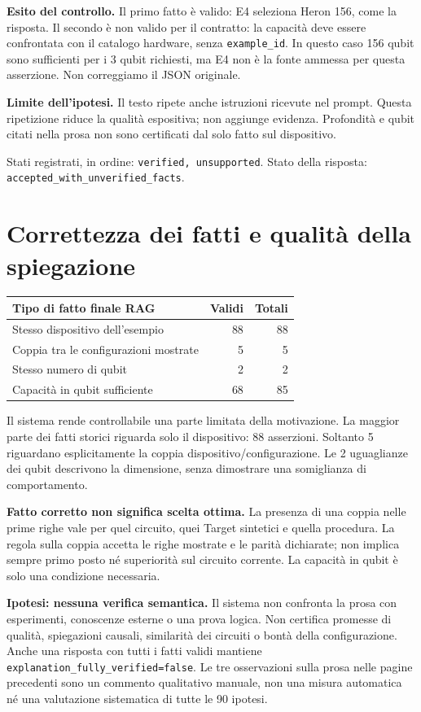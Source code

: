 \documentclass[a4paper,10pt]{article}
\newcommand{\tagline}[1]{{\small\color{ink}\textbf{#1}}\par}
\begin{document}
\textbf{Esito del controllo.} Il primo fatto è valido: E4 seleziona Heron 156, come la risposta. Il secondo è non valido per il contratto: la capacità deve essere confrontata con il catalogo hardware, senza \texttt{example\_id}. In questo caso 156 qubit sono sufficienti per i 3 qubit richiesti, ma E4 non è la fonte ammessa per questa asserzione. Non correggiamo il JSON originale.\par
{\color{warn}\textbf{Limite dell'ipotesi.}} Il testo ripete anche istruzioni ricevute nel prompt. Questa ripetizione riduce la qualità espositiva; non aggiunge evidenza. Profondità e qubit citati nella prosa non sono certificati dal solo fatto sul dispositivo.\par
{\small Stati registrati, in ordine: \texttt{verified, unsupported}. Stato della risposta: \texttt{accepted\_with\_unverified\_facts}.}
\newpage\tagline{PORTATA DEI RISULTATI E RIPRODUCIBILITÀ}
\section*{Correttezza dei fatti e qualità della spiegazione}
\begin{tabularx}{\linewidth}{Xrr}\toprule Tipo di fatto finale RAG & Validi & Totali\\\midrule
Stesso dispositivo dell'esempio & 88 & 88\\
Coppia tra le configurazioni mostrate & 5 & 5\\
Stesso numero di qubit & 2 & 2\\
Capacità in qubit sufficiente & 68 & 85\\
\bottomrule\end{tabularx}\par
Il sistema rende controllabile una parte limitata della motivazione. La maggior parte dei fatti storici riguarda solo il dispositivo: 88 asserzioni. Soltanto 5 riguardano esplicitamente la coppia dispositivo/configurazione. Le 2 uguaglianze dei qubit descrivono la dimensione, senza dimostrare una somiglianza di comportamento.\par
\textbf{Fatto corretto non significa scelta ottima.} La presenza di una coppia nelle prime righe vale per quel circuito, quei Target sintetici e quella procedura. La regola sulla coppia accetta le righe mostrate e le parità dichiarate; non implica sempre primo posto né superiorità sul circuito corrente. La capacità in qubit è solo una condizione necessaria.\par
\textbf{Ipotesi: nessuna verifica semantica.} Il sistema non confronta la prosa con esperimenti, conoscenze esterne o una prova logica. Non certifica promesse di qualità, spiegazioni causali, similarità dei circuiti o bontà della configurazione. Anche una risposta con tutti i fatti validi mantiene \texttt{explanation\_fully\_verified=false}. Le tre osservazioni sulla prosa nelle pagine precedenti sono un commento qualitativo manuale, non una misura automatica né una valutazione sistematica di tutte le 90 ipotesi.\par
\end{document}
